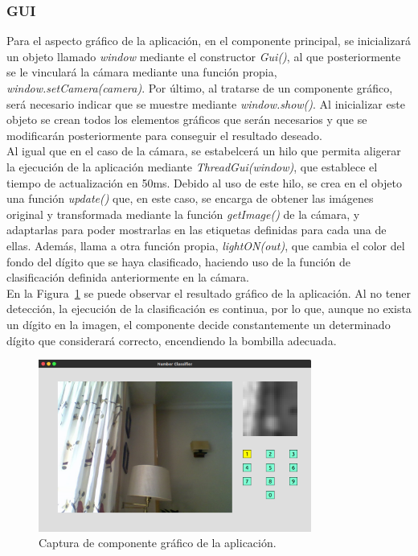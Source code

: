 \subsubsection{GUI}
Para el aspecto gráfico de la aplicación, en el componente principal, se inicializará un objeto llamado \textit{window} mediante el constructor \textit{Gui()}, al que posteriormente se le vinculará la cámara mediante una función propia, \textit{window.setCamera(camera)}. Por último, al tratarse de un componente gráfico, será necesario indicar que se muestre mediante \textit{window.show()}. Al inicializar este objeto se crean todos los elementos gráficos que serán necesarios y que se modificarán posteriormente para conseguir el resultado deseado.\\

Al igual que en el caso de la cámara, se estabelcerá un hilo que permita aligerar la ejecución de la aplicación mediante \textit{ThreadGui(window)}, que establece el tiempo de actualización en 50ms. Debido al uso de este hilo, se crea en el objeto una función \textit{update()} que, en este caso, se encarga de obtener las imágenes original y transformada mediante la función \textit{getImage()} de la cámara, y adaptarlas para poder mostrarlas en las etiquetas definidas para cada una de ellas. Además, llama a otra función propia, \textit{lightON(out)}, que cambia el color del fondo del dígito que se haya clasificado, haciendo uso de la función de clasificación definida anteriormente en la cámara.\\

En la Figura~\ref{fig.gui} se puede observar el resultado gráfico de la aplicación. Al no tener detección, la ejecución de la clasificación es continua, por lo que, aunque no exista un dígito en la imagen, el componente decide constantemente un determinado dígito que considerará correcto, encendiendo la bombilla adecuada.\\

\begin{figure}[H]
	\begin{center}
		\includegraphics[width=0.8\textwidth]{figures/gui}
		\caption{Captura de componente gráfico de la aplicación.}
		\label{fig.gui}
	\end{center}
\end{figure}

